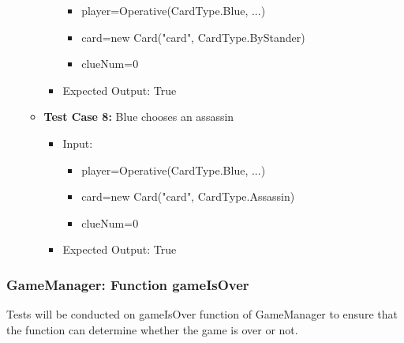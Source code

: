 \documentclass[12pt]{article}
\begin{document}
\begin{itemize}
\begin{itemize}
\begin{itemize}
\begin{itemize}
                    \item player=Operative(CardType.Blue, ...)
                    \item card=new Card("card", CardType.ByStander)
                    \item clueNum=0
                \end{itemize}
            \item Expected Output: True
        \end{itemize}
        \item \textbf{Test Case 8:} Blue chooses an assassin
            \begin{itemize}
            \item Input:
                \begin{itemize}
                    \item player=Operative(CardType.Blue, ...)
                    \item card=new Card("card", CardType.Assassin)
                    \item clueNum=0
                \end{itemize}
            \item Expected Output: True
        \end{itemize}
    \end{itemize}
\end{itemize}

\subsubsection{GameManager: Function gameIsOver}
Tests will be conducted on gameIsOver function of GameManager to ensure that the function can determine whether the game is over or not.
\end{document}
